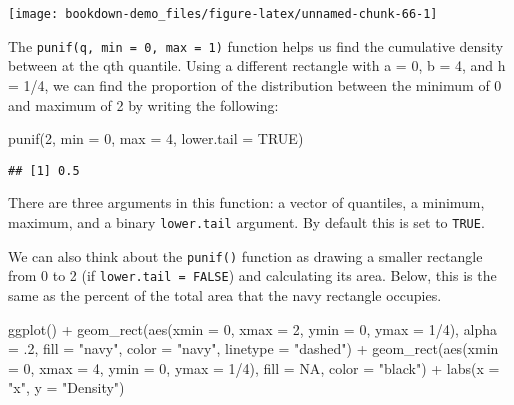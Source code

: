 \documentclass[
]{book}
\newenvironment{Shaded}{\begin{snugshade}}{\end{snugshade}}
\newcommand{\AttributeTok}[1]{\textcolor[rgb]{0.77,0.63,0.00}{#1}}
\newcommand{\ConstantTok}[1]{\textcolor[rgb]{0.00,0.00,0.00}{#1}}
\newcommand{\DecValTok}[1]{\textcolor[rgb]{0.00,0.00,0.81}{#1}}
\newcommand{\FunctionTok}[1]{\textcolor[rgb]{0.00,0.00,0.00}{#1}}
\newcommand{\NormalTok}[1]{#1}
\newcommand{\SpecialCharTok}[1]{\textcolor[rgb]{0.00,0.00,0.00}{#1}}
\newcommand{\StringTok}[1]{\textcolor[rgb]{0.31,0.60,0.02}{#1}}
\begin{document}
\begin{center}\texttt{[image: bookdown-demo\_files/figure-latex/unnamed-chunk-66-1]} \end{center}

The \texttt{punif(q,\ min\ =\ 0,\ max\ =\ 1)} function helps us find the cumulative density between at the qth quantile. Using a different rectangle with a = 0, b = 4, and h = 1/4, we can find the proportion of the distribution between the minimum of 0 and maximum of 2 by writing the following:

\begin{Shaded}
\begin{Highlighting}[]
\FunctionTok{punif}\NormalTok{(}\DecValTok{2}\NormalTok{, }\AttributeTok{min =} \DecValTok{0}\NormalTok{, }\AttributeTok{max =} \DecValTok{4}\NormalTok{, }\AttributeTok{lower.tail =} \ConstantTok{TRUE}\NormalTok{)}
\end{Highlighting}
\end{Shaded}

\begin{verbatim}
## [1] 0.5
\end{verbatim}

There are three arguments in this function: a vector of quantiles, a minimum, maximum, and a binary \texttt{lower.tail} argument. By default this is set to \texttt{TRUE}.

We can also think about the \texttt{punif()} function as drawing a smaller rectangle from 0 to 2 (if \texttt{lower.tail\ =\ FALSE}) and calculating its area. Below, this is the same as the percent of the total area that the navy rectangle occupies.

\begin{Shaded}
\begin{Highlighting}[]
\FunctionTok{ggplot}\NormalTok{() }\SpecialCharTok{+}
  \FunctionTok{geom\_rect}\NormalTok{(}\FunctionTok{aes}\NormalTok{(}\AttributeTok{xmin =} \DecValTok{0}\NormalTok{, }\AttributeTok{xmax =} \DecValTok{2}\NormalTok{, }\AttributeTok{ymin =} \DecValTok{0}\NormalTok{, }\AttributeTok{ymax =} \DecValTok{1}\SpecialCharTok{/}\DecValTok{4}\NormalTok{), }
            \AttributeTok{alpha =}\NormalTok{ .}\DecValTok{2}\NormalTok{, }
            \AttributeTok{fill =} \StringTok{"navy"}\NormalTok{, }
            \AttributeTok{color =} \StringTok{"navy"}\NormalTok{, }
            \AttributeTok{linetype =} \StringTok{"dashed"}\NormalTok{) }\SpecialCharTok{+}
    \FunctionTok{geom\_rect}\NormalTok{(}\FunctionTok{aes}\NormalTok{(}\AttributeTok{xmin =} \DecValTok{0}\NormalTok{, }\AttributeTok{xmax =} \DecValTok{4}\NormalTok{, }\AttributeTok{ymin =} \DecValTok{0}\NormalTok{, }\AttributeTok{ymax =} \DecValTok{1}\SpecialCharTok{/}\DecValTok{4}\NormalTok{), }
              \AttributeTok{fill =} \ConstantTok{NA}\NormalTok{, }
              \AttributeTok{color =} \StringTok{"black"}\NormalTok{) }\SpecialCharTok{+}
  \FunctionTok{labs}\NormalTok{(}\AttributeTok{x =} \StringTok{"x"}\NormalTok{, }\AttributeTok{y =} \StringTok{"Density"}\NormalTok{)}
\end{Highlighting}
\end{Shaded}
\end{document}
